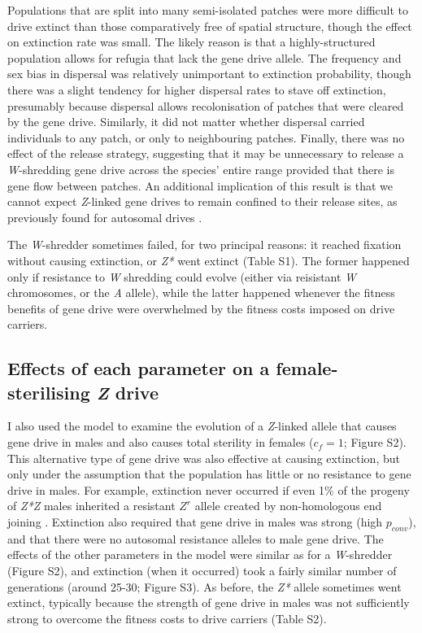 \documentclass[]{rsos}%
\begin{document}
Populations that are split into many semi-isolated patches were more
difficult to drive extinct than those comparatively free of spatial
structure, though the effect on extinction rate was small. The likely
reason is that a highly-structured population allows for refugia that
lack the gene drive allele. The frequency and sex bias in dispersal was
relatively unimportant to extinction probability, though there was a
slight tendency for higher dispersal rates to stave off extinction,
presumably because dispersal allows recolonisation of patches that were
cleared by the gene drive. Similarly, it did not matter whether
dispersal carried individuals to any patch, or only to neighbouring
patches. Finally, there was no effect of the release strategy,
suggesting that it may be unnecessary to release a \emph{W}-shredding
gene drive across the species' entire range provided that there is gene
flow between patches. An additional implication of this result is that
we cannot expect \emph{Z}-linked gene drives to remain confined to their
release sites, as previously found for autosomal drives
\citep{noble2018cu}.

The \emph{W}-shredder sometimes failed, for two principal reasons: it
reached fixation without causing extinction, or \emph{Z*} went extinct
(Table S1). The former happened only if resistance to \emph{W} shredding
could evolve (either via reisistant \emph{W} chromosomes, or the
\emph{A} allele), while the latter happened whenever the fitness
benefits of gene drive were overwhelmed by the fitness costs imposed on
drive carriers.

\hypertarget{effects-of-each-parameter-on-a-female-sterilising-z-drive}{%
\subsection{\texorpdfstring{Effects of each parameter on a
female-sterilising \emph{Z}
drive}{Effects of each parameter on a female-sterilising Z drive}}\label{effects-of-each-parameter-on-a-female-sterilising-z-drive}}

I also used the model to examine the evolution of a \emph{Z}-linked
allele that causes gene drive in males and also causes total sterility
in females (\(c_f = 1\); Figure S2). This alternative type of gene drive
was also effective at causing extinction, but only under the assumption
that the population has little or no resistance to gene drive in males.
For example, extinction never occurred if even 1\% of the progeny of
\emph{Z*Z} males inherited a resistant \(Z^r\) allele created by
non-homologous end joining \citep[c.f.][]{unckless2017ev}. Extinction
also required that gene drive in males was strong (high \(p_{conv}\)),
and that there were no autosomal resistance alleles to male gene drive.
The effects of the other parameters in the model were similar as for a
\emph{W}-shredder (Figure S2), and extinction (when it occurred) took a
fairly similar number of generations (around 25-30; Figure S3). As
before, the \emph{Z*} allele sometimes went extinct, typically because
the strength of gene drive in males was not sufficiently strong to
overcome the fitness costs to drive carriers (Table S2).
\end{document}
